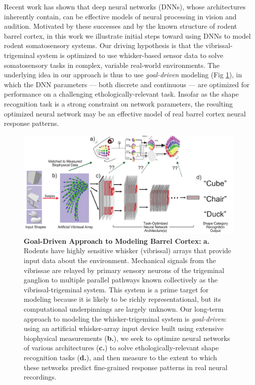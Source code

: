 Recent work has shown that deep neural networks (DNNs), whose architectures inherently contain, can be effective models of neural processing in vision\cite{Yamins2014,khaligh2014deep} and audition\cite{kell_yamins_sfn}.
Motivated by these successes and by the known structure of rodent barrel cortex, in this work we illustrate initial steps toward using DNNs to model rodent somatosensory systems.
Our driving hypothesis is that the vibrissal-trigeminal system is optimized to use whisker-based sensor data to solve somatosensory tasks in complex, variable real-world environments.
The underlying idea in our approach is thus to use \emph{goal-driven} modeling (Fig \ref{fig_schematic}), in which the DNN parameters --- both discrete and continuous --- are optimized for performance on a challenging ethologically-relevant task\cite{yamins2016using}.
Insofar as the shape recognition task is a strong constraint on network parameters, the resulting optimized neural network may be an effective model of real barrel cortex neural response patterns.

\begin{figure}
\centering
\includegraphics [width=1\linewidth]{figures/schematic.pdf}
\vspace{-2mm}
\caption{\textbf{Goal-Driven Approach to Modeling Barrel Cortex:} \textbf{a.} Rodents have highly sensitive whisker (vibrissal) arrays that provide input data about the environment. Mechanical signals from the vibrissae are relayed by primary sensory neurons of the trigeminal ganglion to multiple parallel pathways known collectively as the vibrissal-trigeminal system.  This system is a prime target for modeling because it is likely to be richly representational, but its computational underpinnings are largely unknown. Our long-term approach to modeling the whisker-trigeminal system is \emph{goal-driven}: using an artificial whisker-array input device built using extensive biophysical measurements (\textbf{b.}), we seek to optimize neural networks of various architectures (\textbf{c.}) to solve ethologically-relevant shape recognition tasks (\textbf{d.}), and then measure to the extent to which these networks predict fine-grained response patterns in real neural recordings. ~\label{fig_schematic}}
\end{figure}

